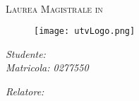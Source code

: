 \documentclass[
12pt,           %
oneside,       %
italian,
liststotoc,    %
toctotoc,      %
]{MastersDoctoralThesis} %
\author{Andrea Di Iorio} %
\begin{document}
\begin{titlepage}
	\begin{center}
	{\scshape\Large \univname\par} %
	\HRule \\
	\textsc{Laurea Magistrale in \degreename}%
	
	\vfill \vspace{4.5cm}
	\HRule 
	\vspace{.7cm}
	{\huge \bfseries \ttitle\par}%
	\vspace{.7cm}
	\HRule %
	 
	 
	\vfill \vspace{5.5cm}
	\begin{figure}[H]
		\centering
	  	\texttt{[image: utvLogo.png]}
	\end{figure}
	\vfill \vspace{0.5cm}
	\begin{minipage}[t]{0.5\textwidth}
	\begin{flushleft} \large
	\emph{Studente:  \authorname\\Matricola: 0277550}\\
	\end{flushleft}
	
	\end{minipage}
	\begin{minipage}[t]{0.4\textwidth}
	\begin{flushright} \large
	\emph{Relatore: \supname}\\
	\end{flushright}
	\end{minipage}\\[3cm]
	\end{center}
\end{titlepage}
\end{document}
